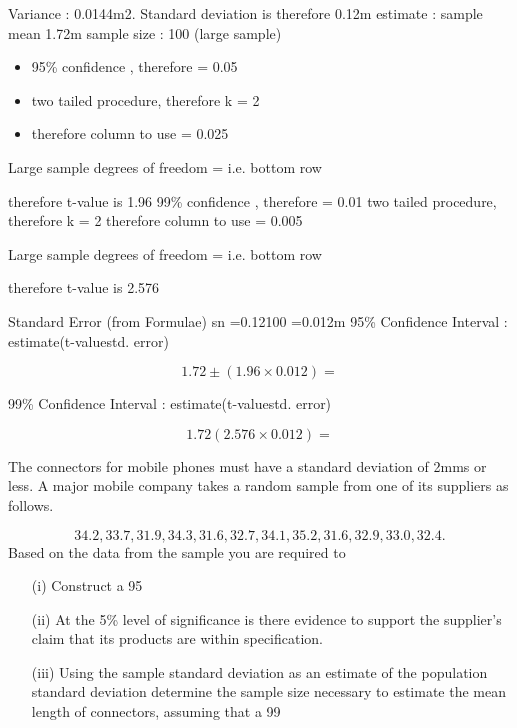 \documentclass[12pt, a4paper]{report}
\theoremstyle{definition}
\theoremstyle{remark}
\begin{document}
 
Variance :  0.0144m2.    Standard deviation is therefore 0.12m
estimate : sample mean  1.72m
sample size : 100  (large sample)
 
\begin{itemize}
\item 95\% confidence , therefore  = 0.05
\item two tailed procedure, therefore k = 2
\item therefore column to use = 0.025
\end{itemize}
 
   Large sample
   degrees of freedom =  i.e. bottom row
 
  therefore t-value is 1.96
       99\% confidence ,
       therefore  = 0.01
       two tailed procedure, therefore k = 2
       therefore column to use = 0.005
 
       Large sample
       degrees of freedom =  i.e. bottom row
 
       therefore t-value is 2.576
                      

Standard Error (from Formulae)     sn        =0.12100       =0.012m
95\% Confidence Interval : estimate(t-valuestd. error)
 
                           \[ 1.72\pm (1.96 \times 0.012) =\]
 

99\% Confidence Interval : estimate(t-valuestd. error)
 
                     \[1.72(2.576\times 0.012) =\]       


 
The connectors for mobile phones must have a standard deviation of 2mms or less.  
A major mobile company takes a random sample from one of its suppliers as follows.

\[ 
34.2, 33.7, 31.9, 34.3, 31.6, 32.7, 34.1, 35.2, 31.6, 32.9, 33.0, 32.4.
\] 
Based on the data from the sample you are required to 
 

\begin{itemize} 
\item[(i)]   Construct a 95%
\item[(ii)]  At the 5\% level of significance is there evidence to support the supplier’s claim that its products are within specification.
\item[(iii)] Using the sample standard deviation as an estimate of the population standard deviation determine the sample size necessary to estimate the mean length of connectors, assuming that a 99%
\end{itemize}
\end{document}
